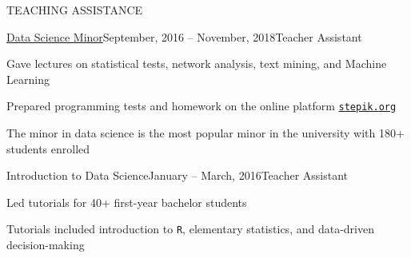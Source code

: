 \documentclass[]{resume} %
\begin{document}
\begin{rSection}{TEACHING ASSISTANCE}

	\begin{rSubsection}{\href{https://electives.hse.ru/en/minor_data_spb/}{Data Science Minor}}{September, 2016 -- November, 2018}{Teacher Assistant}{~}
	    \item Gave lectures on statistical tests, network analysis, text mining, and Machine Learning
		\item Prepared programming tests and homework on the online platform \href{https://stepik.org/}{\texttt{stepik.org}}
		\item The minor in data science is the most popular minor in the university with 180+ students enrolled%
	\end{rSubsection}
	

	\begin{rSubsection}{Introduction to Data Science}{January -- March, 2016}{Teacher Assistant}{~}
        \item Led tutorials for 40+ first-year bachelor students
        \item Tutorials included introduction to \texttt{R}, elementary statistics, and data-driven decision-making\\[-4.1ex]
	\end{rSubsection}

\end{rSection}
\end{document}
